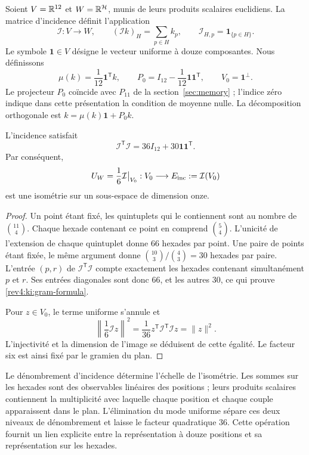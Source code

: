 Soient \(V=\mathbb R^{12}\) et \(W=\mathbb R^{\mathcal H}\), munis de leurs produits scalaires euclidiens. La matrice d'incidence définit l'application
\begin{equation}
 \mathcal I:V\longrightarrow W,
 \qquad (\mathcal I k)_H=\sum_{p\in H}k_p,
 \qquad \mathcal I_{H,p}=\mathbf1_{\{p\in H\}}.
 \label{rev4:ki:incidence-map}
\end{equation}
Le symbole \(\mathbf1\in V\) désigne le vecteur uniforme à douze
composantes. Nous définissons
\[
 \mu(k)=\frac1{12}\mathbf1^{\mathsf T}k,\qquad
 P_0=I_{12}-\frac1{12}\mathbf1\mathbf1^{\mathsf T},\qquad
 V_0=\mathbf1^\perp.
\]
Le projecteur \(P_0\) coïncide avec \(P_{11}\) de la section~\ref{sec:memory} ; l'indice zéro indique dans cette présentation la condition de moyenne nulle. La décomposition orthogonale est \(k=\mu(k)\mathbf1+P_0k\).

\begin{lemma}
\label{rev4:ki:gram}
L’incidence satisfait
\begin{equation}
 \mathcal I^{\mathsf T}\mathcal I
       =36I_{12}+30\mathbf1\mathbf1^{\mathsf T}.
 \label{rev4:ki:gram-formula}
\end{equation}
Par conséquent,
\[
 U_W=\frac16\mathcal I\big|_{V_0}:
 V_0\longrightarrow E_{\rm inc}:=\mathcal I(V_0)
\]
est une isométrie sur un sous-espace de dimension onze.
\end{lemma}
\begin{proof}
Un point étant fixé, les quintuplets qui le contiennent sont au nombre de \(\binom{11}{4}\). Chaque hexade contenant ce point en comprend \(\binom54\). L'unicité de l'extension de chaque quintuplet donne \(66\) hexades par point. Une paire de points étant fixée, le même argument donne \(\binom{10}{3}/\binom43=30\) hexades par paire. L'entrée \((p,r)\) de \(\mathcal I^{\mathsf T}\mathcal I\) compte exactement les hexades contenant simultanément \(p\) et \(r\). Ses entrées diagonales sont donc \(66\), et les autres \(30\), ce qui prouve \eqref{rev4:ki:gram-formula}.

Pour \(z\in V_0\), le terme uniforme s’annule et
\[
 \left\|\frac16\mathcal I z\right\|^2
 =\frac1{36}z^{\mathsf T}
       \mathcal I^{\mathsf T}\mathcal I z
 =\|z\|^2.
\]
L’injectivité et la dimension de l’image se déduisent de cette
égalité. Le facteur six est ainsi fixé par le gramien du plan.
\end{proof}

Le dénombrement d’incidence détermine l’échelle de l’isométrie. Les
sommes sur les hexades sont des observables linéaires des positions ; leurs
produits scalaires contiennent la multiplicité avec laquelle chaque
position et chaque couple apparaissent dans le plan. L’élimination du
mode uniforme sépare ces deux niveaux de dénombrement et laisse le facteur
quadratique \(36\). Cette opération fournit un lien explicite
entre la représentation à douze positions et sa représentation
sur les hexades.

